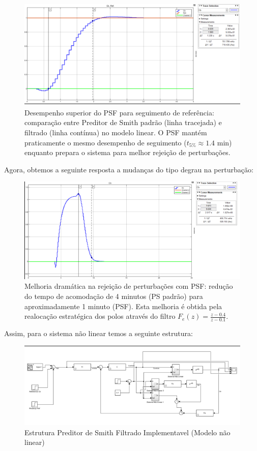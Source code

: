 \documentclass[a4paper,12pt]{article}
\begin{document}
\begin{figure}[H]
    \centering
    \includegraphics[width=0.9\linewidth]{image4.png}
    \caption{Desempenho superior do PSF para seguimento de referência: comparação entre Preditor de Smith padrão (linha tracejada) e filtrado (linha contínua) no modelo linear. O PSF mantém praticamente o mesmo desempenho de seguimento ($t_{5\%} \approx 1.4$ min) enquanto prepara o sistema para melhor rejeição de perturbações.}
    \label{fig:enter-label}
\end{figure}

Agora, obtemos a seguinte resposta a mudanças do tipo degrau na perturbação:

\begin{figure}[H]
    \centering
    \includegraphics[width=0.9\linewidth]{image5.png}
    \caption{Melhoria dramática na rejeição de perturbações com PSF: redução do tempo de acomodação de 4 minutos (PS padrão) para aproximadamente 1 minuto (PSF). Esta melhoria é obtida pela realocação estratégica dos polos através do filtro $F_e(z) = \frac{z-0.4}{z-0.1}$.}
    \label{fig:enter-label}
\end{figure}

Assim, para o sistema não linear temos a seguinte estrutura:

\begin{figure}[H]
    \centering
    \includegraphics[width=0.9\linewidth]{image6.png}
    \caption{Estrutura Preditor de Smith Filtrado Implementavel (Modelo não linear)}
    \label{fig:enter-label}
\end{figure}
\end{document}
